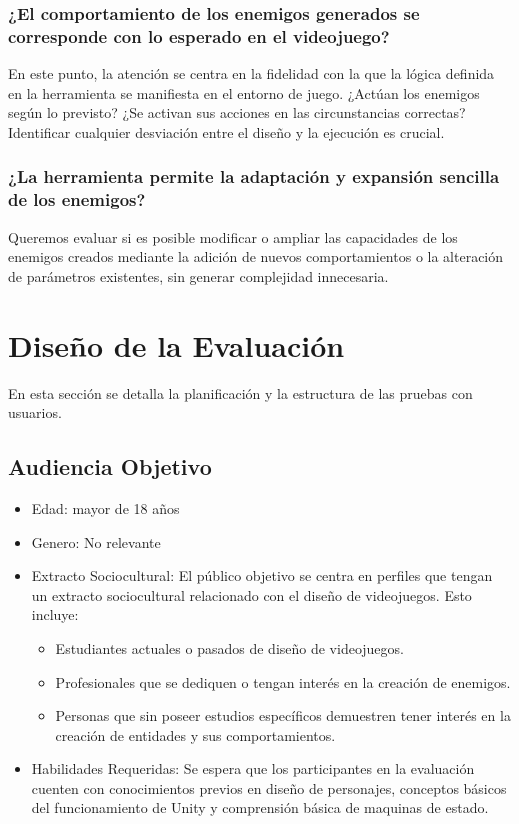\subsubsection{¿El comportamiento de los enemigos generados se corresponde con lo esperado en el videojuego?}
En este punto, la atención se centra en la fidelidad con la que la lógica definida en la herramienta se manifiesta en el entorno de juego. ¿Actúan los enemigos según lo previsto? ¿Se activan sus acciones en las circunstancias correctas? Identificar cualquier desviación entre el diseño y la ejecución es crucial.\\

\subsubsection{¿La herramienta permite la adaptación y expansión sencilla de los enemigos?}
Queremos evaluar si es posible modificar o ampliar las capacidades de los enemigos creados mediante la adición de nuevos comportamientos o la alteración de parámetros existentes, sin generar complejidad innecesaria.

\section{Diseño de la Evaluación}
En esta sección se detalla la planificación y la estructura de las pruebas con usuarios.

\subsection{Audiencia Objetivo}
\begin{itemize}
\item Edad: mayor de 18 años
\item Genero: No relevante
\item Extracto Sociocultural: El público objetivo se centra en perfiles que tengan un extracto sociocultural relacionado con el diseño de videojuegos. Esto incluye:
\begin{itemize}
\item Estudiantes actuales o pasados de diseño de videojuegos.
\item Profesionales que se dediquen o tengan interés en la creación de enemigos.
\item Personas que sin poseer estudios específicos demuestren tener interés en la creación de entidades y sus comportamientos. 
\end{itemize}

\item Habilidades Requeridas:  Se espera que los participantes en la evaluación cuenten con conocimientos previos en diseño de personajes, conceptos básicos del funcionamiento de Unity y comprensión básica de maquinas de estado.
\end{itemize}

